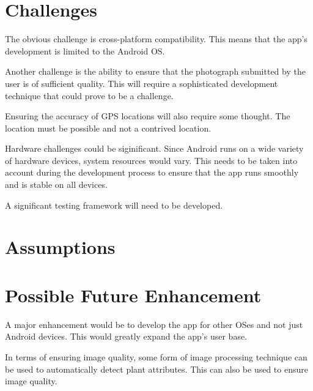 \documentclass[12pt,a4paper,oneside]{article}
\begin{document}
\section{Challenges}
  \begin{spacing}{1.4}
    The obvious challenge is cross-platform compatibility. This means that the app's development is limited to the Android OS.

    Another challenge is the ability to ensure that the photograph submitted by the user is of sufficient quality. This will require a sophisticated development technique that could prove to be a challenge.

    Ensuring the accuracy of GPS locations will also require some thought. The location must be possible and not a contrived location.

    Hardware challenges could be siginificant. Since Android runs on a wide variety of hardware devices, system resources would vary. This needs to be taken into account during the development process to ensure that the app runs smoothly and is stable on all devices.

    A significant testing framework will need to be developed.
  \end{spacing}
\section{Assumptions}
\section{Possible Future Enhancement}
  \begin{spacing}{1.4}
    A major enhancement would be to develop the app for other OSes and not just Android devices. This would greatly expand the app's user base.

    In terms of ensuring image quality, some form of image processing technique can be used to automatically detect plant attributes. This can also be used to ensure image quality.
  \end{spacing}
\end{document}
